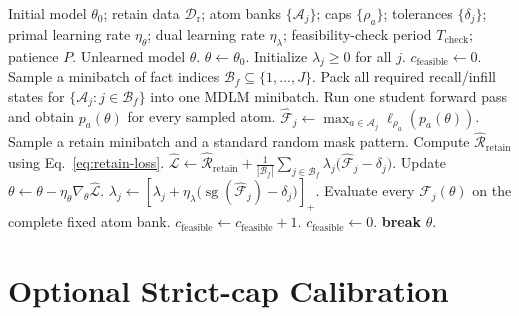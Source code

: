 \documentclass[11pt]{article}
\newcommand{\Dr}{\mathcal{D}_{\mathrm{r}}}
\newcommand{\A}{\mathcal{A}}
\newcommand{\relu}[1]{\left[#1\right]_{+}}
\newcommand{\stopgrad}{\operatorname{sg}}
\newcommand{\FCP}{\textsc{FCP-MDLM}}
\begin{document}
\begin{algorithm}[t]
\caption{\FCP{} training}
\label{alg:training}
\begin{algorithmic}[1]
\Require Initial model $\theta_0$; retain data $\Dr$; atom banks $\{\A_j\}$; caps $\{\rho_a\}$; tolerances $\{\delta_j\}$; primal learning rate $\eta_{\theta}$; dual learning rate $\eta_{\lambda}$; feasibility-check period $T_{\mathrm{check}}$; patience $P$.
\Ensure Unlearned model $\theta$.
\State $\theta\gets\theta_0$.
\State Initialize $\lambda_j\geq0$ for all $j$.
\State $c_{\mathrm{feasible}}\gets0$.
    \State Sample a minibatch of fact indices $\mathcal{B}_f\subseteq\{1,\ldots,J\}$.
    \State Pack all required recall/infill states for $\{\A_j:j\in\mathcal{B}_f\}$ into one MDLM minibatch.
    \State Run one student forward pass and obtain $p_a(\theta)$ for every sampled atom.
        \State $\displaystyle
        \widehat{\mathcal{F}}_j
        \gets
        \max_{a\in\A_j}
        \ell_{\rho_a}\!\left(p_a(\theta)\right)$.
    \EndFor
    \State Sample a retain minibatch and a standard random mask pattern.
    \State Compute $\widehat{\mathcal{R}}_{\mathrm{retain}}$ using Eq.~\eqref{eq:retain-loss}.
    \State $\displaystyle
    \widehat{\mathcal{L}}
    \gets
    \widehat{\mathcal{R}}_{\mathrm{retain}}
    +\frac{1}{|\mathcal{B}_f|}
    \sum_{j\in\mathcal{B}_f}
    \lambda_j\bigl(\widehat{\mathcal{F}}_j-\delta_j\bigr)$.
    \State Update $\theta\gets\theta-\eta_{\theta}\nabla_{\theta}\widehat{\mathcal{L}}$.
        \State $\displaystyle
        \lambda_j
        \gets
        \relu{
            \lambda_j+
            \eta_{\lambda}
            \bigl(\stopgrad(\widehat{\mathcal{F}}_j)-\delta_j\bigr)
        }$.
    \EndFor
        \State Evaluate every $\mathcal{F}_j(\theta)$ on the complete fixed atom bank.
            \State $c_{\mathrm{feasible}}\gets c_{\mathrm{feasible}}+1$.
        \Else
            \State $c_{\mathrm{feasible}}\gets0$.
        \EndIf
            \State \textbf{break}
        \EndIf
    \EndIf
\EndFor
\State \Return $\theta$.
\end{algorithmic}
\end{algorithm}

\section{Optional Strict-cap Calibration}
\end{document}
